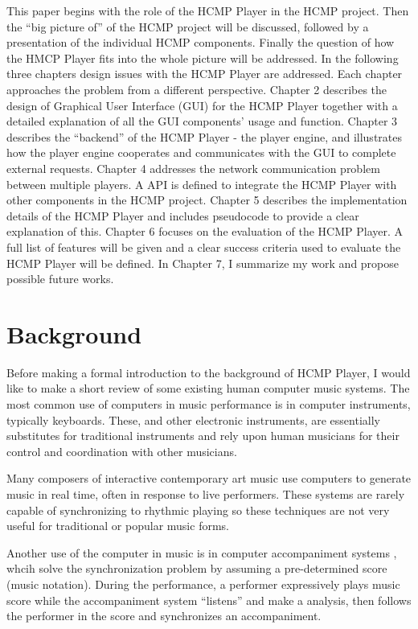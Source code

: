 This paper begins with the role of the HCMP Player in the HCMP project. Then
the ``big picture of'' of the HCMP project will be discussed, followed by a
presentation of the individual HCMP components. Finally the question of how
the HMCP Player fits into the whole picture will be addressed. In the
following three chapters design issues with the HCMP Player are addressed.
Each chapter approaches the problem from a different perspective. Chapter 2
describes the design of Graphical User Interface (GUI) for the HCMP Player together
with a detailed explanation of all the GUI components' usage and function.
Chapter 3 describes the ``backend'' of the HCMP Player - the player engine,
and illustrates how the player engine cooperates and communicates with the
GUI to complete external requests. Chapter 4 addresses the network
communication problem between multiple players. A API is
defined to integrate the HCMP Player with other components in the HCMP
project.  Chapter 5 describes the implementation details of the HCMP Player
and includes pseudocode to provide a clear explanation of this. Chapter 6
focuses on the evaluation of the HCMP Player. A full list of features
will be given and a clear success criteria used to evaluate the HCMP Player
will be defined. In Chapter 7, I summarize my work and propose possible
future works.

\section{Background}

Before making a formal introduction to the background of HCMP Player, 
I would like to make a short review of  
some existing human computer music systems. The most common use of computers in
music performance is in computer instruments, typically keyboards.
These, and other electronic instruments, are essentially substitutes for traditional
instruments and rely upon human musicians for their control and coordination with
other musicians. 

Many composers of interactive contemporary art music use computers
to generate music in real time, often in response to live performers.
These systems are rarely capable of synchronizing to rhythmic playing
so these techniques are not very useful for traditional or popular music 
forms.

Another use of the computer in music is in computer accompaniment systems 
\cite{Roger:89}, 
whcih solve the synchronization problem by assuming a pre-determined 
score (music notation). During the performance, a performer expressively 
plays music score while the accompaniment system ``listens'' and make a analysis, 
then follows the performer 
in the score and synchronizes an accompaniment.

